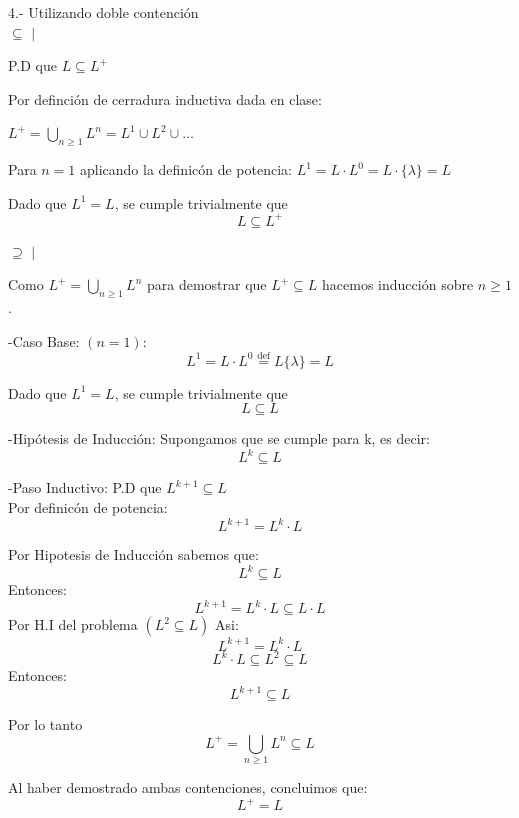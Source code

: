 4.- 
Utilizando doble contención \\
$\subseteq$ $\mid$

P.D que $L\subseteq L^{+}$

Por definción de cerradura inductiva dada en clase:
 
$L^{+}=\bigcup_{n\ge1}L^{n}=L^{1}\cup L^{2}\cup\dots$

Para $n=1$ aplicando la definicón de potencia:
$L^{1}=L \cdot L^{0}=L \cdot \{\lambda\}=L$

Dado que $L^{1}=L$, se cumple trivialmente que 
$$L\subseteq L^{+}$$

$\supseteq$ $\mid$

Como $L^{+}=\bigcup_{n\ge1}L^{n}$ para demostrar que $L^{+}\subseteq L$ hacemos inducción sobre $n\ge1$.

-Caso Base: $(n=1)$:
$$L^{1}=L\cdot L^{0} \overset{\text{def}}{=} L\{\lambda\}=L$$

Dado que $L^{1}=L$, se cumple trivialmente que
$$L \subseteq L$$

-Hipótesis de Inducción:
Supongamos que se cumple para k, es decir:
$$L^{k}\subseteq L$$

-Paso Inductivo:
P.D que $L^{k+1}\subseteq L$ \\
Por definicón de potencia:
$$L^{k+1}=L^{k}\cdot L$$

Por Hipotesis de Inducción sabemos que:
$$L^{k}\subseteq L$$
Entonces:
$$L^{k+1}=L^{k}\cdot L \subseteq L\cdot L$$
Por H.I del problema $(L^{2} \subseteq L)$
Asi:
$$L^{k+1} = L^{k}\cdot L$$
$$L^{k} \cdot L \subseteq L^{2} \subseteq L$$
Entonces:
$$L^{k+1} \subseteq L$$

Por lo tanto
$$L^{+}=\bigcup_{n\ge1}L^{n}\subseteq L$$

Al haber demostrado ambas contenciones, concluimos que:
$$L^{+}=L$$